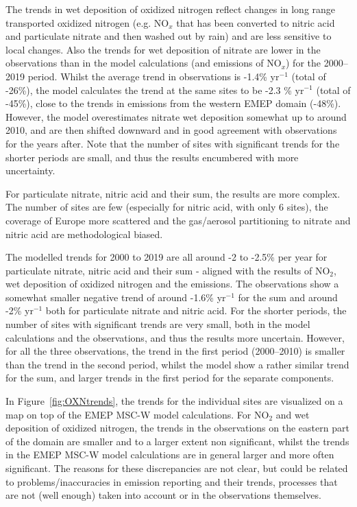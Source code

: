 The trends in wet deposition of oxidized nitrogen reflect changes in long range transported oxidized nitrogen (e.g. NO$_x$ that has been converted to nitric acid and particulate nitrate and then washed out by rain) and are less sensitive to local changes. Also the trends for wet deposition of nitrate are lower in the observations than in the model calculations (and emissions of NO$_x$) for the 2000--2019 period. Whilst the average trend in observations is -1.4\% yr$^{-1}$ (total of -26\%), the model calculates the trend at the same sites to be -2.3 \% yr$^{-1}$ (total of -45\%), close to the trends in emissions from the western EMEP domain (-48\%). %
However, the model overestimates nitrate wet deposition somewhat up to around 2010, and are then shifted downward and in good agreement with observations for the years after. Note that the number of sites with significant trends for the shorter periods are small, and thus the results encumbered with more uncertainty.


For particulate nitrate, nitric acid and their sum, the results are more complex. The number of sites are few (especially for nitric acid, with only 6 sites), the coverage of Europe more scattered and the gas/aerosol partitioning to nitrate and nitric acid are methodological biased\citep{EMEP2014}.

The modelled trends for 2000 to 2019 are all around -2 to -2.5\% per year for particulate nitrate, nitric acid and their sum - aligned with the results of NO$_2$, wet deposition of oxidized nitrogen and the emissions. The observations show a somewhat smaller negative trend of around -1.6\% yr$^{-1}$ for the sum and around -2\% yr$^{-1}$ both for particulate nitrate and nitric acid. For the shorter periods, the number of sites with significant trends are very small, both in the model calculations and the observations, and thus the results more uncertain.
However, for all the three observations, the trend in the first period (2000--2010) is smaller than the trend in the second period, whilst the model show a rather similar trend for the sum, and larger trends in the first period for the separate components.


In Figure~\ref{fig:OXNtrends}, the trends for the individual sites are visualized on a map on top of the EMEP MSC-W model calculations. For NO$_2$ and wet deposition of oxidized nitrogen, the trends in the observations on the eastern part of the domain are smaller and to a larger extent non significant, whilst the trends in the EMEP MSC-W model calculations are in general larger and more often significant. The reasons for these discrepancies are not clear, but could be related to problems/inaccuracies in emission reporting and their trends, processes that are not (well enough) taken into account or in the observations themselves.


